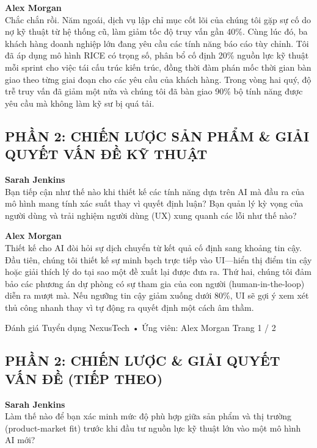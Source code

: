 \documentclass[12pt]{article}
\begin{document}
\vspace{0.5em}
\noindent\textbf{Alex Morgan} \\
Chắc chắn rồi. Năm ngoái, dịch vụ lập chỉ mục cốt lõi của chúng tôi gặp sự cố do nợ kỹ thuật từ hệ thống cũ, làm giảm tốc độ truy vấn gần 40\%. Cùng lúc đó, ba khách hàng doanh nghiệp lớn đang yêu cầu các tính năng báo cáo tùy chỉnh. Tôi đã áp dụng mô hình RICE có trọng số, phân bổ cố định 20\% nguồn lực kỹ thuật mỗi sprint cho việc tái cấu trúc kiến trúc, đồng thời đàm phán mốc thời gian bàn giao theo từng giai đoạn cho các yêu cầu của khách hàng. Trong vòng hai quý, độ trễ truy vấn đã giảm một nửa và chúng tôi đã bàn giao 90\% bộ tính năng được yêu cầu mà không làm kỹ sư bị quá tải.

\subsection*{PHẦN 2: CHIẾN LƯỢC SẢN PHẨM \& GIẢI QUYẾT VẤN ĐỀ KỸ THUẬT}

\noindent\textbf{Sarah Jenkins} \\
Bạn tiếp cận như thế nào khi thiết kế các tính năng dựa trên AI mà đầu ra của mô hình mang tính xác suất thay vì quyết định luận? Bạn quản lý kỳ vọng của người dùng và trải nghiệm người dùng (UX) xung quanh các lỗi như thế nào?

\vspace{0.5em}
\noindent\textbf{Alex Morgan} \\
Thiết kế cho AI đòi hỏi sự dịch chuyển từ kết quả cố định sang khoảng tin cậy. Đầu tiên, chúng tôi thiết kế sự minh bạch trực tiếp vào UI—hiển thị điểm tin cậy hoặc giải thích lý do tại sao một đề xuất lại được đưa ra. Thứ hai, chúng tôi đảm bảo các phương án dự phòng có sự tham gia của con người (human-in-the-loop) diễn ra mượt mà. Nếu ngưỡng tin cậy giảm xuống dưới 80\%, UI sẽ gợi ý xem xét thủ công nhanh thay vì tự động ra quyết định một cách âm thầm.

\vfill
\noindent\small{Đánh giá Tuyển dụng NexusTech • Ứng viên: Alex Morgan \hfill Trang 1 / 2}
\newpage

\subsection*{PHẦN 2: CHIẾN LƯỢC \& GIẢI QUYẾT VẤN ĐỀ (TIẾP THEO)}

\noindent\textbf{Sarah Jenkins} \\
Làm thế nào để bạn xác minh mức độ phù hợp giữa sản phẩm và thị trường (product-market fit) trước khi đầu tư nguồn lực kỹ thuật lớn vào một mô hình AI mới?
\end{document}
